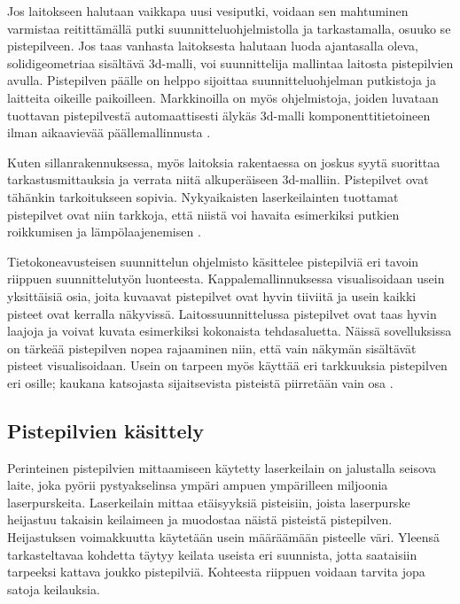 Jos laitokseen halutaan vaikkapa uusi vesiputki, voidaan sen mahtuminen varmistaa reitittämällä putki suunnitteluohjelmistolla ja tarkastamalla, osuuko se pistepilveen. Jos taas vanhasta laitoksesta halutaan luoda ajantasalla oleva, solidigeometriaa sisältävä 3d-malli, voi suunnittelija mallintaa laitosta pistepilvien avulla. Pistepilven päälle on helppo sijoittaa suunnitteluohjelman putkistoja ja laitteita oikeille paikoilleen. Markkinoilla on myös ohjelmistoja, joiden luvataan tuottavan pistepilvestä automaattisesti älykäs 3d-malli komponenttitietoineen ilman aikaavievää päällemallinnusta \cite{aveva}. 

Kuten sillanrakennuksessa, myös laitoksia rakentaessa on joskus syytä suorittaa tarkastusmittauksia ja verrata niitä alkuperäiseen 3d-malliin. Pistepilvet ovat tähänkin tarkoitukseen sopivia. Nykyaikaisten laserkeilainten tuottamat pistepilvet ovat niin tarkkoja, että niistä voi havaita esimerkiksi putkien roikkumisen ja lämpölaajenemisen \cite{Piipponen}. 

Tietokoneavusteisen suunnittelun ohjelmisto käsittelee pistepilviä eri tavoin riippuen suunnittelutyön luonteesta. Kappalemallinnuksessa visualisoidaan usein yksittäisiä osia, joita kuvaavat pistepilvet ovat hyvin tiiviitä ja usein kaikki pisteet ovat kerralla näkyvissä. Laitossuunnittelussa pistepilvet ovat taas hyvin laajoja ja voivat kuvata esimerkiksi kokonaista tehdasaluetta. Näissä sovelluksissa on tärkeää pistepilven nopea rajaaminen niin, että vain näkymän sisältävät pisteet visualisoidaan. Usein on tarpeen myös käyttää eri tarkkuuksia pistepilven eri osille; kaukana katsojasta sijaitsevista pisteistä piirretään vain osa \cite{mikko}. 

\subsection{Pistepilvien käsittely}\label{workflow}

Perinteinen pistepilvien mittaamiseen käytetty laserkeilain on jalustalla seisova laite, joka pyörii pystyakselinsa ympäri ampuen ympärilleen miljoonia laserpurskeita. Laserkeilain mittaa etäisyyksiä pisteisiin, joista laserpurske heijastuu takaisin keilaimeen ja muodostaa näistä pisteistä pistepilven. Heijastuksen voimakkuutta käytetään usein määräämään pisteelle väri. Yleensä tarkasteltavaa kohdetta täytyy keilata useista eri suunnista, jotta saataisiin tarpeeksi kattava joukko pistepilviä. Kohteesta riippuen voidaan tarvita jopa satoja keilauksia.

